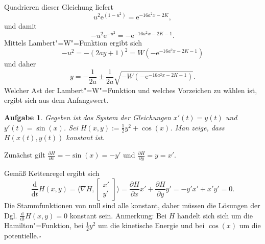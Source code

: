 \documentclass[a4paper,10pt,fleqn,twoside]{scrartcl}
\numberwithin{equation}{section}
\newcommand{\ee}{\mathrm e}
\newcommand{\strong}[1]{{\normalfont\sffamily\bfseries #1}}
\renewcommand{\qedsymbol}{\ensuremath{\square}}
\theoremstyle{Aufgabe}
\newtheorem{Aufgabe}{\sffamily Aufgabe}[section]
\begin{document}
Quadrieren dieser Gleichung liefert
\begin{equation}
u^2\ee^{(1-u^2)} = \ee^{-16a^2x-2K},
\end{equation}
und damit
\begin{equation}
-u^2\ee^{-u^2} = -\ee^{-16a^2x-2K-1}.
\end{equation}
Mittels Lambert"=W"=Funktion ergibt sich
\begin{equation}
-u^2 = -(2ay+1)^2 = W(-\ee^{-16a^2x-2K-1})
\end{equation}
und daher
\begin{equation}
y = -\frac{1}{2a}\pm\frac{1}{2a}\sqrt{-W(-\ee^{-16a^2x-2K-1})}.
\end{equation}
Welcher Ast der Lambert"=W"=Funktion und welches Vorzeichen
zu wählen ist, ergibt sich aus dem Anfangswert.

\begin{Aufgabe}
Gegeben ist das System der Gleichungen $x'(t)=y(t)$ und
$y'(t)=\sin(x)$. Sei $H(x,y):=\tfrac{1}{2}y^2+\cos(x)$.
Man zeige, dass $H(x(t),y(t))$ konstant ist.
\end{Aufgabe}

\noindent\strong{Lösung.}
Zunächst gilt $\tfrac{\partial H}{\partial x}=-\sin(x)=-y'$ und
$\tfrac{\partial H}{\partial y}=y=x'$.

Gemäß Kettenregel ergibt sich
\[\frac{\mathrm d}{\mathrm dt}H(x,y)
= \langle\nabla H,\begin{bmatrix}x'\\ y'\end{bmatrix}\rangle
= \frac{\partial H}{\partial x}x'+\frac{\partial H}{\partial y}y'
= -y'x' + x'y' = 0.\]
Die Stammfunktionen von null sind alle konstant, daher müssen die
Lösungen der Dgl. $\frac{\mathrm d}{\mathrm dt}H(x,y)=0$
konstant sein. Anmerkung: Bei $H$ handelt sich sich um die
Hamilton"=Funktion, bei $\tfrac{1}{2}y^2$ um die kinetische Energie
und bei $\cos(x)$ um die potentielle.\;\qedsymbol
\end{document}
